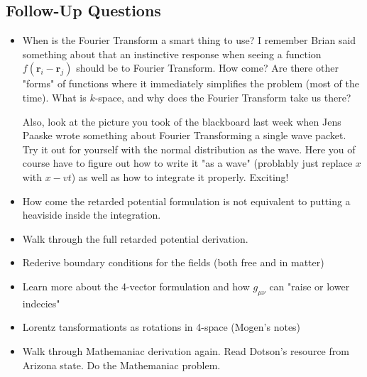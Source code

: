 \subsection*{Follow-Up Questions}
\begin{itemize}
    \item When is the Fourier Transform a smart thing to use? I remember Brian said something about that an instinctive response when seeing a function \(f(\mathbf{r}_i - \mathbf{r}_j)\) should be to Fourier Transform. How come? Are there other "forms" of functions where it immediately simplifies the problem (most of the time). What is \(k\)-space, and why does the Fourier Transform take us there? 
    
    Also, look at the picture you took of the blackboard last week when Jens Paaske wrote something about Fourier Transforming a single wave packet. Try it out for yourself with the normal distribution as the wave. Here you of course have to figure out how to write it "as a wave" (problably just replace \(x\) with \(x - vt\)) as well as how to integrate it properly. Exciting!
    \item How come the retarded potential formulation is not equivalent to putting a heaviside inside the integration.
    \item Walk through the full retarded potential derivation.
    \item Rederive boundary conditions for the fields (both free and in matter)
    \item Learn more about the 4-vector formulation and how \(g_{\mu \nu}\) can "raise or lower indecies"
    \item Lorentz tansformationts as rotations in 4-space (Mogen's notes)
    \item Walk through Mathemaniac derivation again. Read Dotson's resource from Arizona state. Do the Mathemaniac problem.
\end{itemize}
